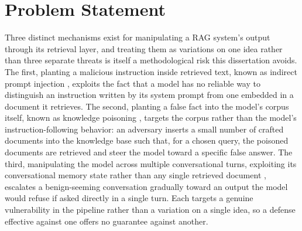 \section{Problem Statement}

Three distinct mechanisms exist for manipulating a RAG system's output
through its retrieval layer, and treating them as variations on one idea
rather than three separate threats is itself a methodological risk this
dissertation avoids. The first, planting a malicious instruction inside
retrieved text, known as indirect prompt injection \cite{greshake2023not},
exploits the fact that a model has no reliable way to distinguish an
instruction written by its system prompt from one embedded in a document
it retrieves. The second, planting a false fact into the model's corpus
itself, known as knowledge poisoning \cite{zou2025poisonedrag}, targets
the corpus rather than the model's instruction-following behavior: an
adversary inserts a small number of crafted documents into the knowledge
base such that, for a chosen query, the poisoned documents are retrieved
and steer the model toward a specific false answer. The third,
manipulating the model across multiple conversational turns, exploiting
its conversational memory state rather than any single retrieved
document \cite{russinovich2025great}, escalates a benign-seeming
conversation gradually toward an output the model would refuse if asked
directly in a single turn. Each targets a genuine vulnerability in the
pipeline rather than a variation on a single idea, so a defense effective
against one offers no guarantee against another.

